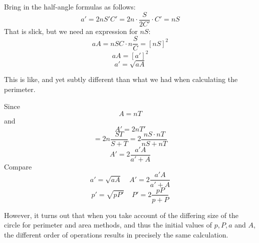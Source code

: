 \documentclass[11pt, oneside]{article}
\begin{document}
Bring in the half-angle formulas as follows:
\[ a' = 2n S'C' = 2n \cdot \frac{S}{2C'} \cdot C' = nS \]
That is slick, but we need an expression for $nS$:
\[ aA = nSC \cdot n \frac{S}{C} = [nS]^2 \]
\[ aA = [a']^2 \]
\[ a' = \sqrt{aA} \]

This is like, and yet subtly different than what we had when calculating the perimeter.

Since
\[ A = nT \]
and
\[ A' = 2nT' \]
\[ = 2n \frac{ST}{S + T} = 2 \frac{nS \cdot nT}{nS + nT} \]
\[ A' = 2 \frac{a'A}{a' + A} \]
Compare
\[ a' = \sqrt{aA}  \ \ \ \ \  A' = 2 \frac{a'A}{a' + A} \]
\[ p' = \sqrt{pP'}  \ \ \ \ \   P' = 2 \frac{pP}{p + P} \]

However, it turns out that when you take account of the differing size of the circle for perimeter and area methods, and thus the initial values of $p,P,a$ and $A$, the different order of operations results in precisely the same calculation.
\end{document}
